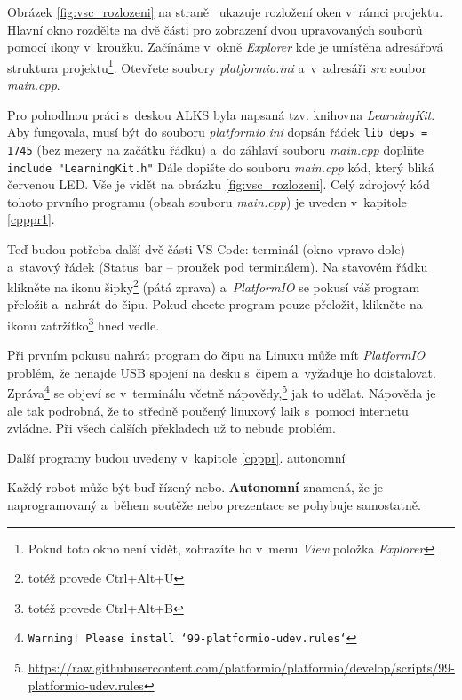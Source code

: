 Obrázek \ref{fig:vsc_rozlozeni} na straně~\pageref{fig:vsc_rozlozeni} ukazuje rozložení oken v~rámci projektu.
Hlavní okno  rozdělte na dvě části pro zobrazení dvou upravovaných souborů pomocí ikony v~kroužku.
Začínáme v~okně 
{\it Explorer}  kde je umístěna adresářová struktura projektu\footnote{Pokud toto okno není vidět, zobrazíte ho v~menu {\it View} položka {\it Explorer} }.
Otevřete soubory {\it platformio.ini} a~v~adresáři {\it src} soubor {\it main.cpp}. 
 
Pro pohodlnou práci s~deskou ALKS byla  napsaná tzv. knihovna {\it LearningKit}. 
Aby fungovala, musí být do souboru {\it platformio.ini} dopsán řádek {\tt lib\_deps = 1745} (bez mezery na začátku řádku) a~do záhlaví souboru {\it main.cpp} doplňte
\verb| include "LearningKit.h"|
Dále dopište do souboru {\it main.cpp} kód, který bliká červenou LED.
Vše je vidět na obrázku \ref{fig:vsc_rozlozeni}.
Celý zdrojový kód tohoto prvního programu (obsah souboru {\it main.cpp}) je uveden v~kapitole \ref{cpppr1}.
 
Teď budou potřeba další dvě části VS Code: terminál  (okno vpravo dole) a~stavový řádek (Status~bar -- proužek pod terminálem). 
Na stavovém řádku klikněte na ikonu šipky\footnote{totéž provede Ctrl+Alt+U} (pátá zprava) a~{\it PlatformIO} se pokusí váš program přeložit a~nahrát do čipu. 
Pokud chcete program pouze přeložit, klikněte na ikonu zatržítko\footnote{totéž provede Ctrl+Alt+B} hned vedle. 

Při prvním pokusu nahrát program do čipu na Linuxu může mít {\it PlatformIO} problém, že nenajde USB spojení na desku s~čipem a~vyžaduje ho doistalovat. 
Zpráva\footnote{\tt Warning! Please install `99-platformio-udev.rules`} se objeví se v~terminálu včetně nápovědy,\footnote{\url{https://raw.githubusercontent.com/platformio/platformio/develop/scripts/99-platformio-udev.rules}} jak to udělat.
Nápověda je ale tak podrobná, že to středně poučený linuxový laik s~pomocí internetu zvládne.
Při všech dalších překladech už to nebude problém.  

Další programy budou uvedeny v~kapitole \ref{cpppr}. \hypertarget{autonomni}{autonomní}


 Každý robot může být buď řízený nebo. {\bf Autonomní }znamená, že je naprogramovaný a~během soutěže nebo prezentace se pohybuje samostatně.
